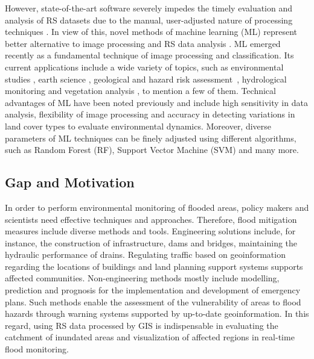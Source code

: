 \documentclass[water,article,accept,pdftex,oneauhor]{Definitions/mdpi}
\begin{document}
{However, state-of-the-art software severely impedes the timely evaluation and analysis of RS datasets due to the manual, user-adjusted nature of processing techniques%
	. In view of this, }novel {methods} of machine learning (ML) {represent better alternative to image processing and RS data analysis%
	.} ML {emerged recently} as a fundamental technique of image processing and classification{. Its current applications include} a wide variety of {topics, such as }environmental studies \cite{ROCHA2022107415}, earth science \cite{LI2023103345,Lemenkova202306,XIONG2021145256}, geological and hazard risk \mbox{assessment \cite{AOURAGH2023100939},} hydrological monitoring \cite{RAFIK2023101569} and vegetation analysis \cite{WU2023110723,Lemenkova202310,DOSSANTOS2022106753}{, to mention a few of them}. Technical advantages of ML have been noted previously \cite{9883389,coasts4010008} {and} include high sensitivity {in data analysis}, flexibility of image {processing} {and accuracy in detecting} variations in {land cover types} to evaluate environmental {dynamics}. {Moreover, diverse parameters of ML techniques} can be finely adjusted using{ different }algorithms, {such as} Random Forest (RF), Support Vector Machine (SVM) {and many more}.

\subsection{Gap and Motivation}

{In order to perform environmental monitoring of flooded areas, policy makers and scientists need effective techniques and approaches. Therefore, }flood mitigation measures include diverse{ }methods {and tools}. Engineering solutions include, for instance, {the }construction of infrastructure, dams and bridges, maintaining the hydraulic performance of drains. Regulating traffic based on geoinformation regarding {the }locations of buildings and land planning support systems supports affected communities. Non-engineering methods mostly include modelling, prediction and prognosis{ }for the implementation and development {of }emergency plans. Such methods enable the assessment of the vulnerability of areas to flood hazards through warning systems supported by up-to-date geoinformation. In this regard, using{ }RS data processed by GIS is indispensable in evaluating the catchment {of inundated} areas and visualization of affected regions in real-time flood monitoring.
\end{document}

